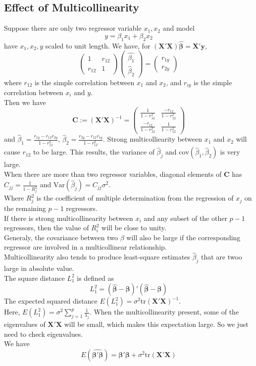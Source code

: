 \documentclass[11pt]{article}
\newcommand{\var}{\mathrm{Var}}
\newcommand{\cov}{\mathrm{cov}}
\newcommand{\tr}{\mathrm{tr}}
\theoremstyle{definition}
\begin{document}
\subsection{Effect of Multicollinearity}
Suppose there are only two regressor variable $x_1,x_2$ and model
\[
y=\beta_1x_1+\beta_2x_2
\]
have $x_1,x_2,y$ scaled to unit length. We have, for $(\bm{X}'\bm{X})\hat{\bm{\beta}}=\bm{X}'\bm{y}$,
\[
\begin{pmatrix}1 & r_{12}\\ r_{12} & 1\end{pmatrix}\begin{pmatrix}\hat{\beta_1}\\\hat{\beta}_2\end{pmatrix} = \begin{pmatrix} r_{1y}\\r_{2y}\end{pmatrix}
\]
where $r_{12}$ is the simple correlation between $x_1$ and $x_2$, and $r_{iy}$ is the simple correlation between $x_i$ and $y$.\\
Then we have
\[
\bm{C}:=(\bm{X}'\bm{X})^{-1}=\begin{pmatrix} \frac{1}{1-r_{12}^2} & \frac{-r_{12}}{1-r_{12}^2}\\ \frac{-r_{12}}{1-r_{12}^2} & \frac{1}{1-r_{12}^2}\end{pmatrix} 
\]
and $\hat{\beta}_1 = \frac{r_{1y}-r_{12}r_{2y}}{1-r_{12}^2}$, $\hat{\beta}_2 = \frac{r_{2y}-r_{12}r_{1y}}{1-r_{12}^2}$.
Strong multicolliearity between $x_1$ and $x_2$ will cause $r_{12}$ to be large. This results, the variance of $\hat{\beta}_j$ and $\cov(\hat{\beta}_1,\hat{\beta}_2)$ is very large.\\

When there are more than two regressor variables, diagonal elements of $\mathbf{C}$ has $C_{jj}=\frac{1}{1-R_j^2}$ and $\var(\hat{\beta}_j)=C_{jj}\sigma^2$.\\
Where $R_j^2$ is the coefficient of multiple determination from the regression of $x_j$ on the remaining $p-1$ regressors. \\
If there is strong multicollinearity between $x_i$ and any subset of the other $p-1$ regressors, then the value of $R_i^2$ will be close to unity.\\
Generaly, the covariance between two $\beta$ will also be large if the corresponding regressor are involved in a multicollinear relationship.\\
Multicollinearity also tends to produce least-square estimates $\hat{\beta}_j$ that are twoo large in absolute value.\\
The square distance $L_1^2$ is defined as 
\[
L_1^2=(\hat{\bm{\beta}}-\bm{\beta})'(\hat{\bm{\beta}}-\bm{\beta})
\]
The expected squared distance $E(L_1^2)=\sigma^2\tr(\bm{X}'\bm{X})^{-1}$.\\
Here, $E(L_1^2)=\sigma^2\sum_{j=1}^p \frac{1}{\lambda_j}$. When the multicollinearity present, some of the eigenvalues of $\bm{X}'\bm{X}$ will be small, which makes this expectation large. So we just need to check eigenvalues.\\
We have
\[
E(\hat{\bm{\beta}'\bm{\beta}}) = \bm{\beta}'\bm{\beta} + \sigma^2\tr(\bm{X}'\bm{X})
\] 
\end{document}
